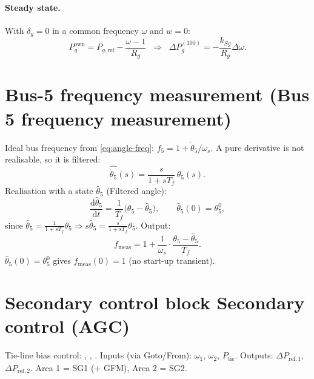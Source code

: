 \documentclass[11pt,a4paper]{article}
\numberwithin{equation}{section}
\newcommand{\dd}{\mathrm{d}}
\newcommand{\blk}[1]{\textsf{#1}}
\begin{document}
\paragraph{Steady state.} With $\dot\delta_g = 0$ in a common frequency $\omega$ and $w=0$:
\begin{equation}
P_g^{\text{own}} = P_{g,\text{ref}} - \frac{\omega - 1}{R_g}
\;\;\Longrightarrow\;\;
\Delta P_g^{(100)} = -\frac{k_{Sg}}{R_g}\Delta\omega .
\label{eq:gfm-ss}
\end{equation}

\section{Bus-5 frequency measurement (\blk{Bus 5 frequency measurement})}
Ideal bus frequency from \eqref{eq:angle-freq}: $f_5 = 1 + \dot\theta_5/\omega_s$.
A pure derivative is not realisable, so it is filtered:
\begin{equation}
\widehat{\dot\theta_5}(s) = \frac{s}{1+sT_f}\,\theta_5(s).
\end{equation}
Realisation with a state $\hat\theta_5$ (\blk{Filtered angle}):
\begin{equation}
\boxed{\frac{\dd\hat\theta_5}{\dd t} = \frac{1}{T_f}\big(\theta_5 - \hat\theta_5\big),\qquad \hat\theta_5(0) = \theta_5^0,}
\end{equation}
since $\hat\theta_5 = \frac{1}{1+sT_f}\theta_5 \Rightarrow s\hat\theta_5 = \frac{s}{1+sT_f}\theta_5$. Output:
\begin{equation}
\boxed{f_{\text{meas}} = 1 + \frac{1}{\omega_s}\cdot\frac{\theta_5 - \hat\theta_5}{T_f}.}
\end{equation}
$\hat\theta_5(0)=\theta_5^0$ gives $f_{\text{meas}}(0)=1$ (no start-up transient).

\section{Secondary control block \blk{Secondary control (AGC)}}
%
\noindent Tie-line bias control: \cite[Ch.~11]{Kundur1994}, \cite{KothariNagrath2011}, \cite{KulkarniNPTEL}.
Inputs (via Goto/From): $\omega_1$, $\omega_2$, $P_{\text{tie}}$. Outputs: $\Delta P_{\text{ref},1}$, $\Delta P_{\text{ref},2}$.
Area 1 = SG1 (+ GFM), Area 2 = SG2.
\end{document}
